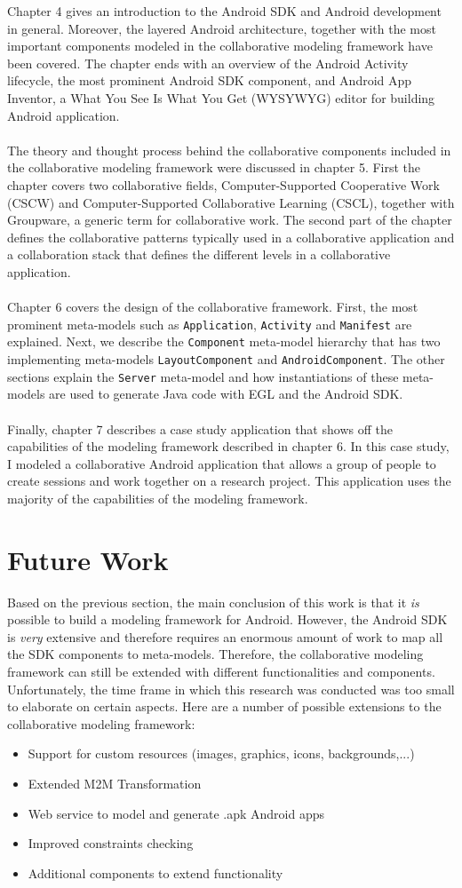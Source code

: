 Chapter 4 gives an introduction to the Android SDK and Android development in general. Moreover, the layered Android architecture, together with the most important components modeled in the collaborative modeling framework have been covered. The chapter ends with an overview of the Android Activity lifecycle, the most prominent Android SDK component, and Android App Inventor, a What You See Is What You Get (WYSYWYG) editor for building Android application. \\ \\
The theory and thought process behind the collaborative components included in the collaborative modeling framework were discussed in chapter 5. First the chapter covers two collaborative fields, Computer-Supported Cooperative Work (CSCW) and Computer-Supported Collaborative Learning (CSCL), together with Groupware, a generic term for collaborative work. The second part of the chapter defines the collaborative patterns typically used in a collaborative application and a collaboration stack that defines the different levels in a collaborative application.  \\ \\
Chapter 6 covers the design of the collaborative framework. First, the most prominent meta-models such as \texttt{Application}, \texttt{Activity} and \texttt{Manifest} are explained. Next, we describe the \texttt{Component} meta-model hierarchy that has two implementing meta-models \texttt{LayoutComponent} and \texttt{AndroidComponent}. The other sections explain the \texttt{Server} meta-model and how instantiations of these meta-models are used to generate Java code with EGL and the Android SDK. \\ \\
Finally, chapter 7 describes a case study application that shows off the capabilities of the modeling framework described in chapter 6. In this case study, I modeled a collaborative Android application that allows a group of people to create sessions and work together on a research project. This application uses the majority of the capabilities of the modeling framework.

\section{Future Work}

Based on the previous section, the main conclusion of this work is that it \textit{is} possible to build a modeling framework for Android. However, the Android SDK is \textit{very} extensive and therefore requires an enormous amount of work to map all the SDK components to meta-models. Therefore, the collaborative modeling framework can still be extended with different functionalities and components. Unfortunately, the time frame in which this research was conducted was too small to elaborate on certain aspects. Here are a number of possible extensions to the collaborative modeling framework:

\begin{itemize}
\item{Support for custom resources (images, graphics, icons, backgrounds,...)}
\item{Extended M2M Transformation}
\item{Web service to model and generate .apk Android apps}
\item{Improved constraints checking}
\item{Additional components to extend functionality}
\end{itemize}
